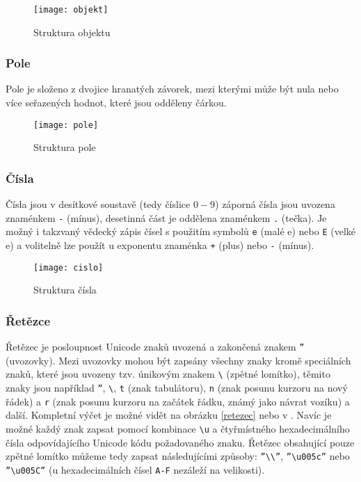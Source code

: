 \begin{figure}[!htb]
\centering
\texttt{[image: objekt]}
\caption{Struktura objektu}
\label{objekt}
\end{figure}

\subsubsection{Pole}
Pole je složeno z dvojice hranatých závorek, mezi kterými může být nula nebo více seřazených hodnot, které jsou odděleny čárkou.

\begin{figure}[!htb]
\centering
\texttt{[image: pole]}
\caption{Struktura pole}
\label{pole}
\end{figure}

\subsubsection{Čísla}
Čísla jsou v desítkové soustavě (tedy číslice $0 - 9$) záporná čísla jsou uvozena znaménkem \texttt{-} (mínus), desetinná část je oddělena znaménkem \texttt{.} (tečka). Je možný i takzvaný vědecký zápis čísel s použitím symbolů \texttt{e} (malé e) nebo \texttt{E} (velké e) a volitelně lze použít u exponentu znaménka \texttt{+} (plus) nebo \texttt{-} (mínus).

\begin{figure}[!htb]
\centering
\texttt{[image: cislo]}
\caption{Struktura čísla}
\label{cislo}
\end{figure}

\subsubsection{Řetězce}
Řetězec je posloupnost Unicode znaků uvozená a zakončená znakem \texttt{\textquotedblright} (uvozovky). Mezi uvozovky mohou být zapsány všechny znaky kromě speciálních znaků, které jsou uvozeny tzv. únikovým znakem \texttt{\textbackslash} (zpětné lomítko), těmito znaky jsou například \texttt{\textquotedblright}, \texttt{\textbackslash}, \texttt{t} (znak tabulátoru), \texttt{n} (znak posunu kurzoru na nový řádek) a \texttt{r} (znak posunu kurzoru na začátek řádku, známý jako návrat vozíku) a další. Kompletní výčet je možné vidět na obrázku \ref{retezec} nebo v \cite{json}. Navíc je možné každý znak zapsat pomocí kombinace \texttt{\textbackslash u} a čtyřmístného hexadecimálního čísla odpovídajícího Unicode kódu požadovaného znaku. Řetězec obsahující pouze zpětné lomítko můžeme tedy zapsat následujícími způsoby: \texttt{\textquotedblright\textbackslash\textbackslash\textquotedblright}, \texttt{\textquotedblright\textbackslash u005c\textquotedblright} nebo \texttt{\textquotedblright\textbackslash u005C\textquotedblright} (u hexadecimálních čísel \texttt{A-F} nezáleží na velikosti).

